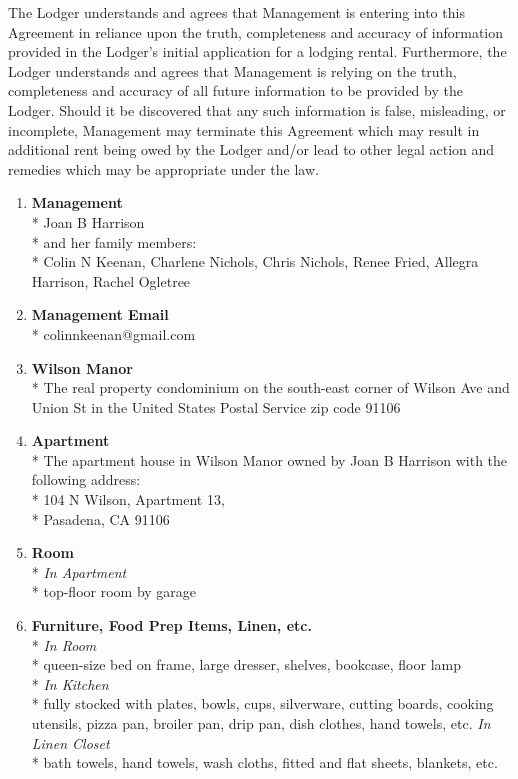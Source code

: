 \documentclass[12pt,letterpaper]{article}
\newcommand{\mom}{Joan B Harrison}
\newcommand{\management}{Management}
\newcommand{\myemail}{Management Email}
\newcommand{\condo}{Wilson Manor}
\newcommand{\apt}{Apartment}
\newcommand{\room}{Room}
\newcommand{\furniture}{Furniture, Food Prep Items, Linen, etc.}
\newcommand{\lodger}{Lodger}
\begin{document}
The \lodger{} understands and agrees that \management{} is entering into this Agreement in reliance upon the truth, completeness and accuracy of information provided in the \lodger{}'s initial application for a lodging rental. Furthermore, the \lodger{} understands and agrees that \management{} is relying on the truth, completeness and accuracy of all future information to be provided by the \lodger{}. Should it be discovered that any such information is false, misleading, or incomplete, \management{} may terminate this Agreement which may result in additional rent being owed by the \lodger{} and/or lead to other legal action and remedies which may be appropriate under the law. 

\begin{multicols}{2}
	\begin{enumerate} 
		\item \textbf{\management{}}\\* \label{management}
			\noindent \mom{}\\*
			and her family members:\\*
			Colin N Keenan,
			Charlene Nichols,
			Chris Nichols,
			Renee Fried,
			Allegra Harrison,
			Rachel Ogletree
				
		\item \textbf{\myemail{}}\\* \label{myemail}
			colinnkeenan@gmail.com

		\item \textbf{\condo{}}\\* \label{condo}
			The real property condominium on the south-east corner of Wilson Ave and Union St in the United States Postal Service zip code 91106

		\item \textbf{\apt{}}\\* \label{apt}
			The apartment house in \condo{} owned by \mom{} with the following address:\\*
			104 N Wilson, \apt{} 13,\\* 
			Pasadena, CA  91106

		\item \textbf{\room{}}\\* \label{room}
			\textit{In \apt{}}\\*
			top-floor room by garage


		\item \textbf{\furniture{}}\\* \label{furniture}
			\textit{In \room{}}\\*
			queen-size bed on frame, large dresser, shelves, bookcase, floor lamp\\*
			\textit{In Kitchen}\\*
			fully stocked with plates, bowls, cups, silverware, cutting boards, cooking utensils, pizza pan, broiler pan, drip pan, dish clothes, hand towels, etc.
			\textit{In Linen Closet}\\*
			bath towels, hand towels, wash cloths, fitted and flat sheets, blankets, etc.


\end{enumerate}
\end{multicols}
\end{document}
